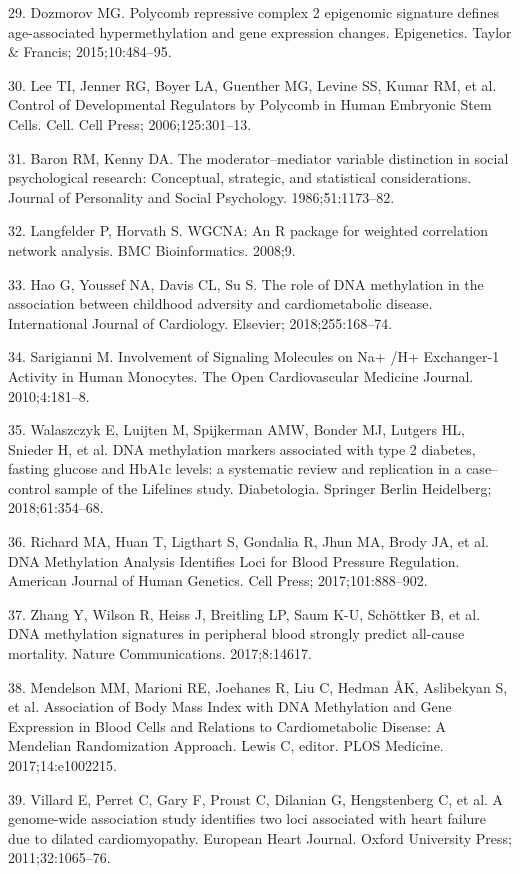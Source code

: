 \documentclass[]{bmcart}
\begin{document}
29. Dozmorov MG. Polycomb repressive complex 2 epigenomic signature
defines age-associated hypermethylation and gene expression changes.
Epigenetics. Taylor \& Francis; 2015;10:484--95.

30. Lee TI, Jenner RG, Boyer LA, Guenther MG, Levine SS, Kumar RM, et
al. Control of Developmental Regulators by Polycomb in Human Embryonic
Stem Cells. Cell. Cell Press; 2006;125:301--13.

31. Baron RM, Kenny DA. The moderator--mediator variable distinction in
social psychological research: Conceptual, strategic, and statistical
considerations. Journal of Personality and Social Psychology.
1986;51:1173--82.

32. Langfelder P, Horvath S. WGCNA: An R package for weighted
correlation network analysis. BMC Bioinformatics. 2008;9.

33. Hao G, Youssef NA, Davis CL, Su S. The role of DNA methylation in
the association between childhood adversity and cardiometabolic disease.
International Journal of Cardiology. Elsevier; 2018;255:168--74.

34. Sarigianni M. Involvement of Signaling Molecules on Na+ /H+
Exchanger-1 Activity in Human Monocytes. The Open Cardiovascular
Medicine Journal. 2010;4:181--8.

35. Walaszczyk E, Luijten M, Spijkerman AMW, Bonder MJ, Lutgers HL,
Snieder H, et al. DNA methylation markers associated with type 2
diabetes, fasting glucose and HbA1c levels: a systematic review and
replication in a case--control sample of the Lifelines study.
Diabetologia. Springer Berlin Heidelberg; 2018;61:354--68.

36. Richard MA, Huan T, Ligthart S, Gondalia R, Jhun MA, Brody JA, et
al. DNA Methylation Analysis Identifies Loci for Blood Pressure
Regulation. American Journal of Human Genetics. Cell Press;
2017;101:888--902.

37. Zhang Y, Wilson R, Heiss J, Breitling LP, Saum K-U, Sch{ö}ttker B,
et al. DNA methylation signatures in peripheral blood strongly predict
all-cause mortality. Nature Communications. 2017;8:14617.

38. Mendelson MM, Marioni RE, Joehanes R, Liu C, Hedman ÅK, Aslibekyan
S, et al. Association of Body Mass Index with DNA Methylation and Gene
Expression in Blood Cells and Relations to Cardiometabolic Disease: A
Mendelian Randomization Approach. Lewis C, editor. PLOS Medicine.
2017;14:e1002215.

39. Villard E, Perret C, Gary F, Proust C, Dilanian G, Hengstenberg C,
et al. A genome-wide association study identifies two loci associated
with heart failure due to dilated cardiomyopathy. European Heart
Journal. Oxford University Press; 2011;32:1065--76.
\end{document}
